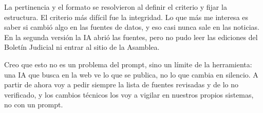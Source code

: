 \documentclass[11pt,letterpaper]{article}
\begin{document}
La pertinencia y el formato se resolvieron al definir el criterio y fijar la
estructura. El criterio más difícil fue la integridad.
Lo que más me interesa es saber si cambió algo en las fuentes de datos, y
eso casi nunca sale en las noticias. En la segunda versión la IA abrió las
fuentes, pero no pudo leer las ediciones del Boletín Judicial ni entrar al
sitio de la Asamblea.

Creo que esto no es un problema del prompt, sino un límite de la herramienta:
una IA que busca en la web ve lo que se publica, no lo que cambia en
silencio. A partir de ahora voy a pedir siempre la lista de fuentes revisadas
y de lo no verificado, y los cambios técnicos los voy a vigilar en nuestros
propios sistemas, no con un prompt.
\end{document}
